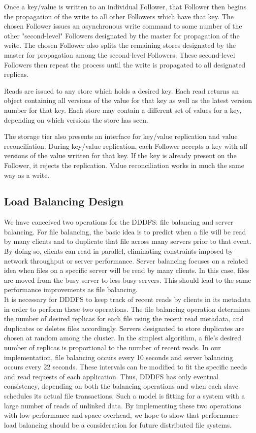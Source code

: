 \documentclass[twoside]{article}
\begin{document}
\begin{multicols}{2}
Once a key/value is written to an individual Follower, that Follower then begins the propagation of the write to all other Followers which have that key. The chosen Follower issues an asynchronous write command to some number of the other "second-level" Followers designated by the master for propagation of the write. The chosen Follower also splits the remaining stores designated by the master for propagation among the second-level Followers. These second-level Followers then repeat the process until the write is propagated to all designated replicas.

Reads are issued to any store which holds a desired key. Each read returns an object containing all versions of the value for that key as well as the latest version number for that key. Each store may contain a different set of values for a key, depending on which versions the store has seen.

The storage tier also presents an interface for key/value replication and value reconciliation. During key/value replication, each Follower accepts a key with all versions of the value written for that key. If the key is already present on the Follower, it rejects the replication. Value reconciliation works in much the same way as a write.

\subsection*{Load Balancing Design}
We have conceived two operations for the DDDFS: file balancing and server balancing. For file balancing, the basic idea is to predict when a file will be read by many clients and to duplicate that file across many servers prior to that event. By doing so, clients can read in parallel, eliminating constraints imposed by network throughput or server performance. Server balancing focuses on a related idea when files on a specific server will be read by many clients. In this case, files are moved from the busy server to less busy servers. This should lead to the same performance improvements as file balancing. \\\indent
It is necessary for DDDFS to keep track of recent reads by clients in its metadata in order to perform these two operations.  The file balancing operation determines the number of desired replicas for each file using the recent read metadata, and duplicates or deletes files accordingly. Servers designated to store duplicates are chosen at random among the cluster. In the simplest algorithm, a file's desired number of replicas is proportional to the number of recent reads. In our implementation, file balancing occurs every 10 seconds and server balancing occurs every 22 seconds. These intervals can be modified to fit the specific needs and read requests of each application. Thus, DDDFS has only eventual consistency, depending on both the balancing operations and when each slave schedules its actual file transactions. Such a model is fitting for a system with a large number of reads of unlinked data. By implementing these two operations with low performance and space overhead, we hope to show that performance load balancing should be a consideration for future distributed file systems.


\end{multicols}
\end{document}
